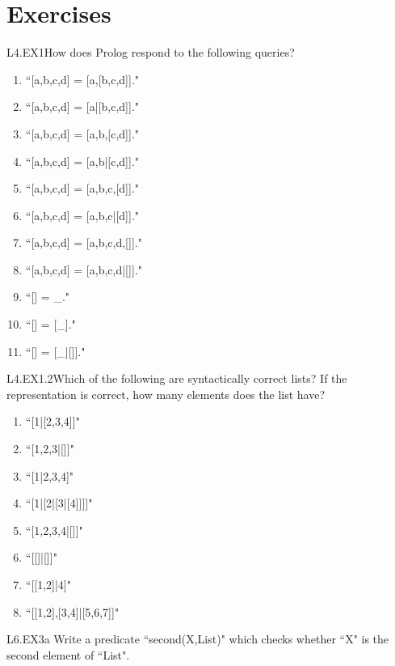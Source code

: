 \section{Exercises}\label{SEC.L4.EXERCISES}

\begin{LPNexercise}{L4.EX1}How does Prolog respond to the following queries?
\begin{enumerate}
\item{}``[a,b,c,d] = [a,[b,c,d]]."
\item{}``[a,b,c,d] = [a|[b,c,d]]."
\item{}``[a,b,c,d] = [a,b,[c,d]]."
\item{}``[a,b,c,d] = [a,b|[c,d]]."
\item{}``[a,b,c,d] = [a,b,c,[d]]."
\item{}``[a,b,c,d] = [a,b,c|[d]]."
\item{}``[a,b,c,d] = [a,b,c,d,[]]."
\item{}``[a,b,c,d] = [a,b,c,d|[]]."
\item{}``[] = \_."
\item{}``[] = [\_]."
\item{}``[] = [\_|[]]."
\end{enumerate}
\end{LPNexercise}
\begin{LPNexercise}{L4.EX1.2}Which of the following are syntactically correct lists? If the representation is correct, how many elements does the list have?

\begin{enumerate}
\item{}``[1|[2,3,4]]"
\item{}``[1,2,3|[]]"
\item{}``[1|2,3,4]"


\item{}``[1|[2|[3|[4]]]]"
\item{}``[1,2,3,4|[]]"
\item{}``[[]|[]]"
\item{}``[[1,2]|4]"
\item{}``[[1,2],[3,4]|[5,6,7]]"


\end{enumerate}
\end{LPNexercise}


\begin{LPNexercise}{L6.EX3a}
Write a predicate ``second(X,List)" which checks
whether ``X" is the second element of ``List".
\end{LPNexercise}


